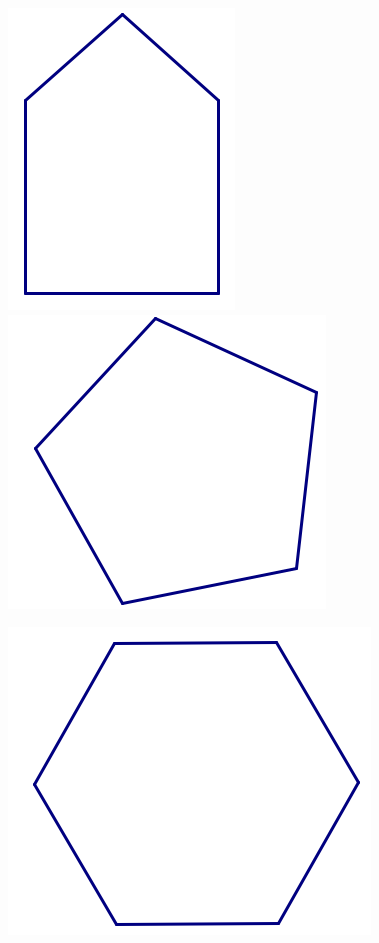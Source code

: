 \documentclass[12pt, reqno]{amsart}
\theoremstyle{remark}
\theoremstyle{definition}
\numberwithin{equation}{section}  %
\begin{document}
\begin{center}
\includegraphics[scale=0.95]{pent1}
\includegraphics[scale=0.95]{pentagon}

\includegraphics[scale=0.85]{hexagon}



\end{center}
\end{document}
